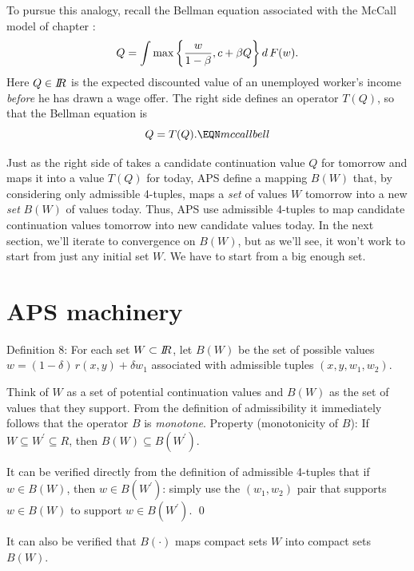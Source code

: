 To pursue this analogy, recall the Bellman
equation associated with the  McCall model
of chapter :
$$ Q = \int  \max \left\{ {w \over 1 -\beta} , c + \beta Q \right\}
 d \, F(w). $$
Here $Q \in {\bbR}$  is the expected discounted value of an unemployed  worker's
income {\it before\/} he has drawn a wage offer.
The right side defines an operator $T(Q)$, so
that the Bellman equation is $$Q  = T(Q). \EQN mccallbell $$

  Just as the right  side of  takes a candidate continuation value
 $Q$ for tomorrow
and maps it  into a value $T(Q)$ for today, APS define a mapping
$B(W)$ that, by considering only admissible 4-tuples,  maps a
{\it set\/} of values $W$ tomorrow into a new {\it set\/} $B(W)$ of
values today.
Thus, APS use
admissible 4-tuples to map candidate continuation values tomorrow  into
new candidate values today.
In the next section, we'll iterate to convergence on $B(W)$,
 but as we'll see,
it won't work to start from just any initial set $W$. We have to start
from a big enough set.

\section{APS machinery}

\medskip\noindent
{\sc Definition 8:}  For each set $W\subset \bbR$, let $B(W)$ be the set of
possible values $w=(1-\delta)\, r(x,y) + \delta w_1$ associated with
admissible tuples $(x,y,w_1,w_2)$.

\medskip
 Think of
$W$ as a set of potential continuation values and $B(W)$ as the
set of values that they support. From the
definition of admissibility it immediately follows that the operator $B$ is
{\it monotone}.
\medskip\noindent
{\sc Property} (monotonicity of $B$):  If $W\subseteq W^\prime \subseteq R$,
then $B(W) \subseteq B(W^\prime)$.

\medskip
{}
It can be verified directly from the definition of admissible 4-tuples that
if $w\in B(W)$, then $w \in B(W^\prime)$:  simply use the $(w_1,w_2)$
pair that supports $w\in B(W)$ to support $w\in B(W^\prime)$.
\qed

\medskip
It can also be verified that $B(\cdot)$ maps compact sets $W$ into compact
sets $B(W)$.

